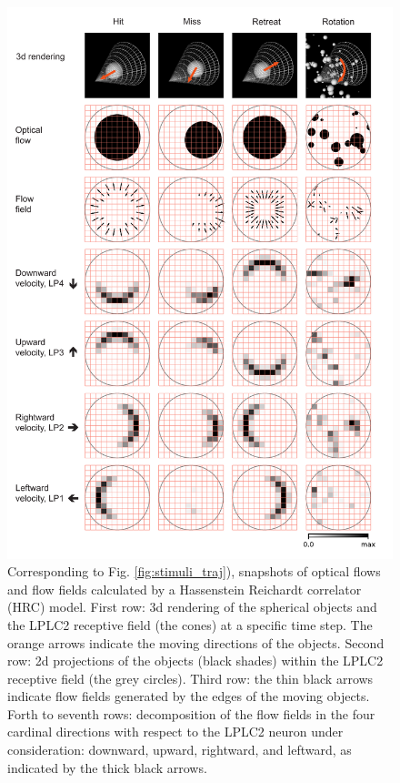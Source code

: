 \documentclass[9pt,lineno]{elife}
\begin{document}
\begin{figure}
\includegraphics[width=\linewidth]{figures/stimuli_2_paper.pdf}
\caption{Corresponding to Fig. \ref{fig:stimuli_traj}), snapshots of optical flows and flow fields calculated by a Hassenstein Reichardt correlator (HRC) model. First row: 3d rendering of the spherical objects and the LPLC2 receptive field (the cones) at a specific time step. The orange arrows indicate the moving directions of the objects. Second row: 2d projections of the objects (black shades) within the LPLC2 receptive field (the grey circles). Third row: the thin black arrows indicate flow fields generated by the edges of the moving objects. Forth to seventh rows: decomposition of the flow fields in the four cardinal directions with respect to the LPLC2 neuron under consideration: downward, upward, rightward, and leftward, as indicated by the thick black arrows.}
\label{fig:stimuli_flow}

\end{figure}
\end{document}

